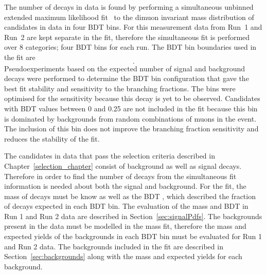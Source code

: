 The number of \bmumu decays in data is found by performing a simultaneous unbinned extended maximum likelihood fit~\cite{Brun:1997pa,James:1975dr} to the dimuon invariant mass distribution of \bmumu candidates in data in four BDT bins. For this measurement data from Run~1 and Run~2 are kept separate in the fit, therefore the simultaneous fit is performed over 8 categories; four BDT bins for each run.
The BDT bin boundaries used in the fit are
\begin{equation}
[0.25, 0.4, 0.5, 0.6, 1.0].
\label{eq:BDTbins}
\end{equation}
Pseudoexperiments based on the expected number of signal and background decays were performed to determine the BDT bin configuration that gave the best fit stability and sensitivity to the \bmumu branching fractions. The bins were optimised for the \bdmumu sensitivity because this decay is yet to be observed.
Candidates with BDT values between 0 and 0.25 are not included in the fit because this bin is dominated by backgrounds from random combinations of muons in the event. The inclusion of this bin does not improve the branching fraction sensitivity and reduces the stability of the fit. %

The candidates in data that pass the selection criteria described in Chapter~\ref{selection_chapter} consist of background as well as signal decays. Therefore in order to find the number of \bmumu decays from the simultaneous fit information is needed about both the signal and background. For the fit, the mass \pdfs of \bmumu decays must be know as well as the BDT \pdf, which described the fraction of \bmumu decays expected in each BDT bin. The evaluation of the \bmumu mass and BDT \pdfs in Run 1 and Run 2 data are described in Section~\ref{sec:signalPdfs}. The backgrounds present in the data must be modelled in the mass fit, therefore the mass \pdfs and expected yields of the backgrounds in each BDT bin must be evaluated for Run 1 and Run 2 data. The backgrounds included in the fit are described in Section~\ref{sec:backgrounds} along with the mass \pdfs and expected yields for each background. 




